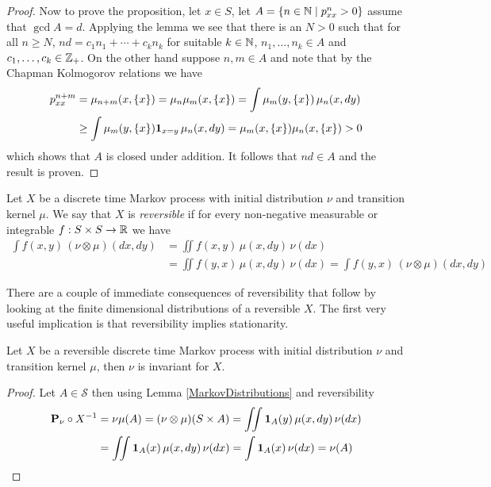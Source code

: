 \begin{proof}
Now to prove the proposition, let $x \in S$,  let $A = \lbrace n \in \naturals \mid
p^n_{xx} > 0 \rbrace$ assume that $\gcd A = d$.  Applying the lemma we
see that there is an $N > 0$ such that for all $n \geq N$, $nd = c_1 n_1 + \dotsb + c_k
n_k$ for suitable $k \in \naturals$, $n_1, \dotsc, n_k \in A$ and $c_1, \dotsc, c_k \in
\integers_+$.  On the other hand suppose $n, m \in A$ and note that by
the Chapman Kolmogorov relations we have 
\begin{align*}
p^{n+m}_{xx} &= \mu_{n+m}(x, \lbrace x \rbrace) = \mu_{n}\mu_m(x,
\lbrace x \rbrace) = \int \mu_m(y , \lbrace x \rbrace) \, \mu_n(x, dy)
\\
&\geq \int \mu_m(y, \lbrace x \rbrace) \characteristic{x=y} \,
\mu_n(x, dy) 
= \mu_m(x, \lbrace x \rbrace) \mu_n(x, \lbrace x \rbrace) 
> 0
\end{align*}
which shows that $A$ is closed under addition.  It follows that $nd
\in A$ and the result is proven.
\end{proof}

\begin{defn}Let $X$ be a discrete time Markov process with initial
  distribution $\nu$ and transition kernel $\mu$.  We say that $X$ is
  \emph{reversible} if for every non-negative measurable or integrable $f : S \times
  S \to \reals$ we have
\begin{align*}
\int f(x,y) \, (\nu \otimes \mu)(dx,dy) 
&= \iint f(x,y) \, \mu(x, dy) \, \nu(dx) \\
&= \iint f(y,x) \, \mu(x, dy) \, \nu(dx)
= \int f(y,x) \, (\nu \otimes \mu)(dx,dy) 
\end{align*}
\end{defn}

There are a couple of immediate consequences of reversibility that
follow by looking at the finite dimensional distributions of a
reversible $X$.  The first very useful implication is that
reversibility implies stationarity.

\begin{prop}\label{ReversibleImpliesInvariant}Let $X$ be a reversible discrete time Markov process with initial
  distribution $\nu$ and transition kernel $\mu$, then $\nu$ is
  invariant for $X$.
\end{prop}
\begin{proof}
Let $A \in \mathcal{S}$ then using Lemma \ref{MarkovDistributions} and reversibility
\begin{align*}
\pushforward{X}{\probabilityop_{\nu}}
&= \nu \mu (A) 
= (\nu \otimes \mu)(S \times A) 
=  \iint \characteristic{A}(y) \, \mu(x, dy) \, \nu(dx) \\
&=  \iint \characteristic{A}(x) \, \mu(x, dy) \, \nu(dx) 
= \int \characteristic{A}(x) \, \nu(dx) 
= \nu(A)
\end{align*}
\end{proof}


